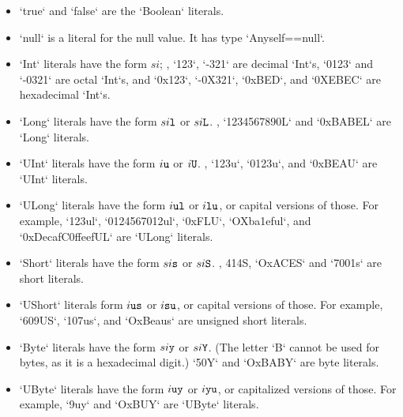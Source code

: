 \begin{itemize}

\item \xcd`true` and \xcd`false` are the \xcd`Boolean` literals. 

\item \xcd`null` is a literal for the null value.  It has type
      \xcd`Any{self==null}`.  

\item {}
\xcd`Int` literals have the form {$si$}; \eg, \xcd`123`,
      \xcd`-321` are decimal \xcd`Int`s, \xcd`0123` and \xcd`-0321` are octal
      \xcd`Int`s, and \xcd`0x123`, \xcd`-0X321`,  \xcd`0xBED`, and \xcd`0XEBEC` are
      hexadecimal \xcd`Int`s.  

\item \xcd`Long` literals have the form {$si{\tt l}$} or
      {$si{\tt L}$}. \Eg, \xcd`1234567890L`  and \xcd`0xBABEL` are \xcd`Long` literals. 

\item \xcd`UInt` literals have the form {$i{\tt u}$} or {$i {\tt U}$}.
      \Eg, \xcd`123u`, \xcd`0123u`, and \xcd`0xBEAU` are \xcd`UInt` literals.

\item \xcd`ULong` literals have the form {$i {\tt ul}$} or {$i {\tt
      lu}$}, or capital versions of those.  For example, 
      \xcd`123ul`, \xcd`0124567012ul`,  \xcd`0xFLU`, \xcd`OXba1eful`, and \xcd`0xDecafC0ffeefUL` are \xcd`ULong`
      literals. 

\item \xcd`Short` literals have the form {$si{\tt s}$} or
      {$si{\tt S}$}. \Eg,  414S, \xcd`OxACES` and \xcd`7001s` are short
      literals. 

\item \xcd`UShort` literals  form {$i {\tt us}$} or {$i {\tt
      su}$}, or capital versions of those.  For example, \xcd`609US`, 
      \xcd`107us`, and \xcd`OxBeaus` are unsigned short literals.

\item \xcd`Byte` literals have the form  {$si{\tt y}$} or
      {$si{\tt Y}$}.  (The letter \xcd`B` cannot be used for bytes, as it is
      a hexadecimal digit.)  \xcd`50Y` and \xcd`OxBABY` are byte literals.

\item \xcd`UByte` literals have the form {$i {\tt uy}$} or {$i {\tt yu}$}, or
      capitalized versions of those.  For example, \xcd`9uy` and \xcd`OxBUY`
      are \xcd`UByte` literals.
      



\end{itemize}
